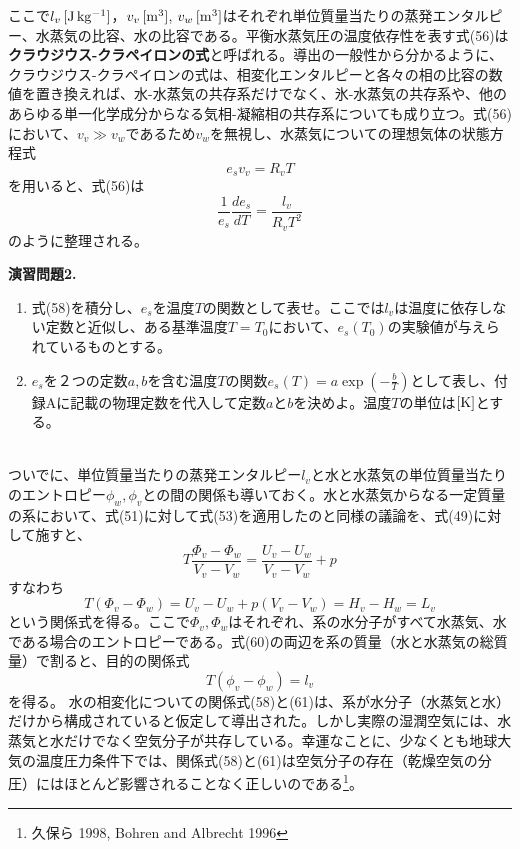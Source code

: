 \documentclass{jsarticle}
\begin{document}
ここで$l_{v}\, [\rm{J\,kg^{-1}}]$，$v_{v}\, [\rm{m^{3}}]$, $v_{w}\, [\rm{m^{3}}]$はそれぞれ単位質量当たりの蒸発エンタルピー、水蒸気の比容、水の比容である。平衡水蒸気圧の温度依存性を表す式(56)は{\bf クラウジウス-クラペイロンの式}と呼ばれる。導出の一般性から分かるように、クラウジウス-クラペイロンの式は、相変化エンタルピーと各々の相の比容の数値を置き換えれば、水-水蒸気の共存系だけでなく、氷-水蒸気の共存系や、他のあらゆる単一化学成分からなる気相-凝縮相の共存系についても成り立つ。式(56)において、$v_{v} \gg v_{w}$であるため$v_{w}$を無視し、水蒸気についての理想気体の状態方程式
\begin{equation}
 e_{s}v_{v}=R_{v}T
\end{equation}
を用いると、式(56)は
\begin{equation}
 \frac{1}{e_{s}}\frac{de_{s}}{dT}=\frac{l_{v}}{R_{v}T^{2}}
\end{equation}
のように整理される。
\\
\begin{itembox}[l]{\bf{演習問題2.}}
\begin{enumerate}
\item 式(58)を積分し、$e_{s}$を温度$T$の関数として表せ。ここでは$l_{v}$は温度に依存しない定数と近似し、ある基準温度$T=T_{0}$において、$e_{s}(T_{0})$の実験値が与えられているものとする。
\item $e_{s}$を２つの定数$a,b$を含む温度$T$の関数$e_{s}(T)=a\exp(-\frac{b}{T})$として表し、付録Aに記載の物理定数を代入して定数$a$と$b$を決めよ。温度$T$の単位は$[\rm{K}]$とする。
\end{enumerate}
\end{itembox}
\\

ついでに、単位質量当たりの蒸発エンタルピー$l_{v}$と水と水蒸気の単位質量当たりのエントロピー$\phi_{w},\phi_{v}$との間の関係も導いておく。水と水蒸気からなる一定質量の系において、式(51)に対して式(53)を適用したのと同様の議論を、式(49)に対して施すと、
\begin{equation}
 T\frac{\Phi_{v}-\Phi_{w}}{V_{v}-V_{w}}=\frac{U_{v}-U_{w}}{V_{v}-V_{w}}+p
\end{equation}
すなわち
\begin{equation}
 T(\Phi_{v}-\Phi_{w})=U_{v}-U_{w}+p(V_{v}-V_{w})=H_{v}-H_{w}=L_{v}
\end{equation}
という関係式を得る。ここで$\Phi_{v},\Phi_{w}$はそれぞれ、系の水分子がすべて水蒸気、水である場合のエントロピーである。式(60)の両辺を系の質量（水と水蒸気の総質量）で割ると、目的の関係式
\begin{equation}
 T(\phi_{v}-\phi_{w})=l_{v}
\end{equation}
を得る。 水の相変化についての関係式(58)と(61)は、系が水分子（水蒸気と水）だけから構成されていると仮定して導出された。しかし実際の湿潤空気には、水蒸気と水だけでなく空気分子が共存している。幸運なことに、少なくとも地球大気の温度圧力条件下では、関係式(58)と(61)は空気分子の存在（乾燥空気の分圧）にはほとんど影響されることなく正しいのである\footnote{久保ら 1998, Bohren and Albrecht 1996}。
\end{document}
